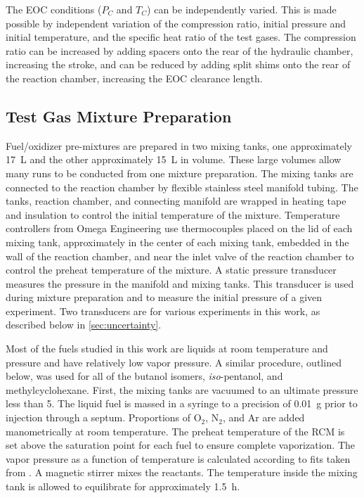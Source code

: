 \documentclass[12pt, letterpaper]{article}
\begin{document}
The EOC conditions ($P_C$ and $T_C$) can be independently varied. This
is made possible by independent variation of the compression ratio,
initial pressure and initial temperature, and the specific heat ratio
of the test gases. The compression ratio can be
increased by adding spacers onto the rear of the hydraulic chamber,
increasing the stroke, and can be reduced by adding split shims onto
the rear of the reaction chamber, increasing the EOC clearance length.

\subsection{Test Gas Mixture Preparation}

Fuel/oxidizer pre-mixtures are prepared in two mixing tanks, one approximately
\SI{17}{\liter} and the other approximately \SI{15}{\liter} in volume. These large volumes allow many
runs to be conducted from one mixture preparation. The mixing tanks are connected
to the reaction chamber by flexible stainless steel manifold tubing. The tanks, reaction chamber,
and connecting manifold are wrapped in heating tape and insulation to control the initial
temperature of the mixture. Temperature controllers from Omega Engineering use thermocouples
placed on the lid of each mixing tank, approximately in the center of each mixing tank, embedded in
the wall of the reaction chamber, and near the inlet valve of the reaction chamber to control the
preheat temperature of the mixture. A static pressure transducer
measures the pressure in the manifold and mixing tanks. This transducer is used
during mixture preparation and to measure the initial pressure of a given experiment.
Two transducers are for various experiments in this work, as described below
in \autoref{sec:uncertainty}.

Most of the fuels studied in this work are liquids at room temperature and
pressure and have relatively low vapor pressure. A similar procedure, outlined
below, was used for all of the butanol isomers, \textit{iso}-pentanol, and
methylcyclohexane. First, the mixing tanks are vacuumed to an ultimate pressure
less than \SI{5}{\torr}. The liquid fuel is massed in a syringe to a precision of
\SI{0.01}{\gram} prior to injection through a septum. Proportions of O$_2$, N$_2$, and
Ar are added manometrically at room temperature. The preheat temperature of
the RCM is set above the saturation point for each fuel to ensure complete
vaporization. The vapor pressure as a function of temperature is calculated
according to fits taken from \textcite{Yaws1999}. A magnetic stirrer mixes
the reactants. The temperature inside the mixing tank is allowed to
equilibrate for approximately \SI{1.5}{\hour}.
\end{document}
